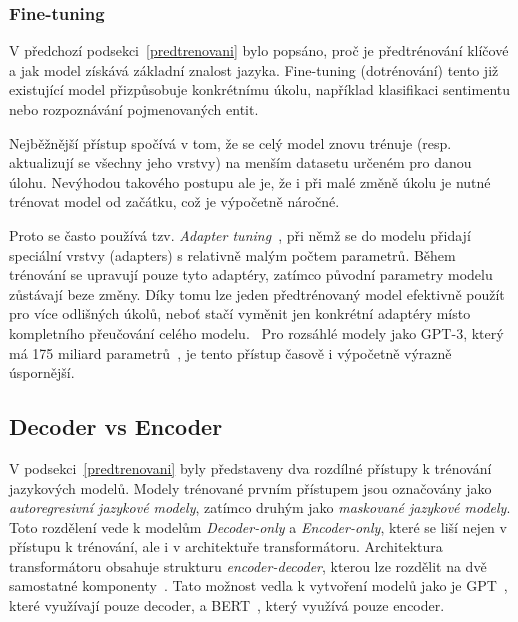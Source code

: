 \subsubsection{Fine-tuning}
V předchozí podsekci~\ref{predtrenovani} bylo popsáno, proč je předtrénování klíčové a jak model získává základní znalost jazyka. Fine-tuning (dotrénování) tento již existující model přizpůsobuje konkrétnímu úkolu, například klasifikaci sentimentu nebo rozpoznávání pojmenovaných entit.  

Nejběžnější přístup spočívá v tom, že se celý model znovu trénuje (resp. aktualizují se všechny jeho vrstvy) na menším datasetu určeném pro danou úlohu. Nevýhodou takového postupu ale je, že i při malé změně úkolu je nutné trénovat model od začátku, což je výpočetně náročné.~\cite{Wei_2024, min2021recentadvancesnaturallanguage}

Proto se často používá tzv. \emph{Adapter tuning}~\cite{pfeiffer-etal-2021-adapterfusion, houlsby2019parameterefficienttransferlearningnlp}, při němž se do modelu přidají speciální vrstvy (adapters) s relativně malým počtem parametrů. Během trénování se upravují pouze tyto adaptéry, zatímco původní parametry modelu zůstávají beze změny. Díky tomu lze jeden předtrénovaný model efektivně použít pro více odlišných úkolů, neboť stačí vyměnit jen konkrétní adaptéry místo kompletního přeučování celého modelu.~\cite{Wei_2024, min2021recentadvancesnaturallanguage} Pro rozsáhlé modely jako GPT-3, který má 175 miliard parametrů~\cite{brown2020languagemodelsfewshotlearners}, je tento přístup časově i výpočetně výrazně úspornější.

\subsection{Decoder vs Encoder}\label{DECENC}

V podsekci~\ref{predtrenovani} byly představeny dva rozdílné přístupy k trénování jazykových modelů. Modely trénované prvním přístupem jsou označovány jako \emph{autoregresivní jazykové modely}, zatímco druhým jako \emph{maskované jazykové modely}. Toto rozdělení vede k modelům \emph{Decoder-only} a \emph{Encoder-only}, které se liší nejen v přístupu k trénování, ale i v architektuře transformátoru. Architektura transformátoru obsahuje strukturu \emph{encoder-decoder}, kterou lze rozdělit na dvě samostatné komponenty~\cite{vaswani2023attentionneed}. Tato možnost vedla k vytvoření modelů jako je GPT~\cite{radford2018improving}, které využívají pouze decoder, a BERT~\cite{devlin2019bert}, který využívá pouze encoder.

